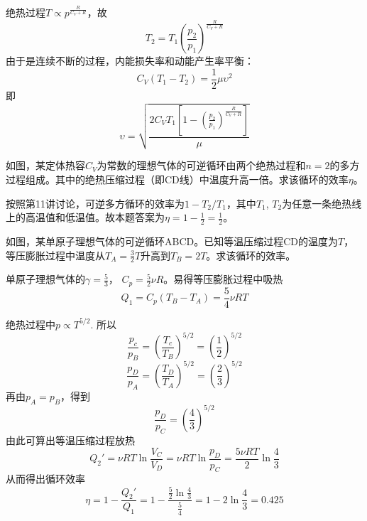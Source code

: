 \documentclass[CJK]{beamer}
\begin{document}
\begin{frame}
  \bch
  绝热过程$T\propto p^{\frac{R}{C_V+R}}$，故
  $$T_2 = T_1\left(\frac{p_2}{p_1}\right)^{\frac{R}{C_V+R}}$$
  由于是连续不断的过程，内能损失率和动能产生率平衡：
  $$  C_V(T_1-T_2) =  \frac{1}{2}\mu\upsilon^2$$
  即
  $$\upsilon = \sqrt{\frac{2C_VT_1\left[1-\left(\frac{p_2}{p_1}\right)^{\frac{R}{C_V+R}}\right]}{\mu}}$$
  
  \ech
\end{frame}

\begin{frame}
  \chtitle{\proid (\stwo)}
  \bch

  如图，某定体热容$C_V$为常数的理想气体的可逆循环由两个绝热过程和$n=2$的多方过程组成。其中的绝热压缩过程（即CD线）中温度升高一倍。求该循环的效率$\eta$。
  \ech
\end{frame}

\begin{frame}
  \bch
  按照第11讲讨论，可逆多方循环的效率为$1-T_2/T_1$，其中$T_1$, $T_2$为任意一条绝热线上的高温值和低温值。故本题答案为$\eta = 1 - \frac{1}{2} = \frac{1}{2}$。
  \ech
\end{frame}

\begin{frame}
  \chtitle{\proid (\sthree)}
  \bch

  如图，某单原子理想气体的可逆循环ABCD。已知等温压缩过程CD的温度为$T$，等压膨胀过程中温度从$T_A=\frac{3}{2}T$升高到$T_B=2T$。求该循环的效率。
  
  \ech
\end{frame}

\begin{frame}
  \bch
  {\scriptsize
  单原子理想气体的$\gamma = \frac{5}{3}$， $C_p = \frac{5}{2}\nu R$。易得等压膨胀过程中吸热
  $$Q_1 = C_p(T_B-T_A) = \frac{5}{4}\nu R T$$

  绝热过程中$p \propto T^{5/2}$.
  所以
  $$\frac{p_c}{p_B} = \left(\frac{T_c}{T_B}\right)^{5/2} = \left(\frac{1}{2}\right)^{5/2}$$
  $$\frac{p_D}{p_A} =\left(\frac{T_D}{T_A}\right)^{5/2} = \left(\frac{2}{3}\right)^{5/2}$$
  再由$p_A=p_B$，得到
  $$\frac{p_D}{p_C} =   \left(\frac{4}{3}\right)^{5/2}$$
  由此可算出等温压缩过程放热
  $$ Q_2' = \nu R T \ln \frac{V_C}{V_D} = \nu R T \ln \frac{p_D}{p_C} = \frac{5\nu RT}{2} \ln\frac{4}{3} $$
  从而得出循环效率
  $$\eta = 1 - \frac{Q_2'}{Q_1} = 1 - \frac{\frac{5}{2}\ln\frac{4}{3}}{\frac{5}{4}} = 1-2\ln\frac{4}{3} = 0.425 $$
  }
  \ech
\end{frame}
\end{document}
